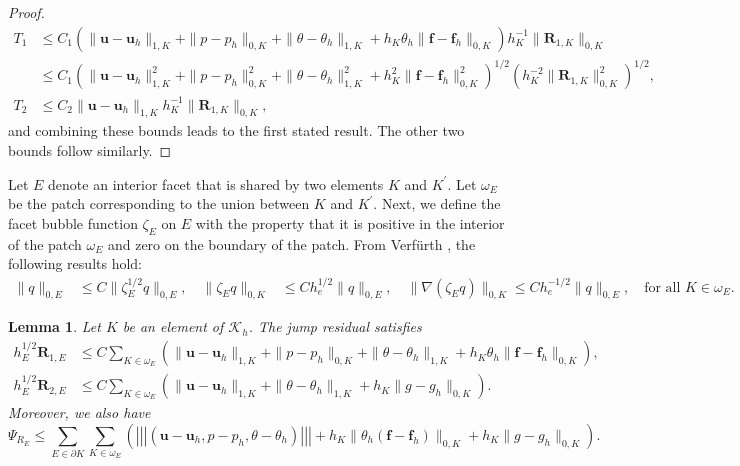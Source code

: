 \documentclass[10pt,a4paper]{article}
\newtheorem{lemma} {\bf Lemma}
\begin{document}
\begin{proof}
\begin{align*}
T_1 &\leq  C_1 \left( \| \boldsymbol{u} - \boldsymbol{u}_h \|_{1,K} + \|p-p_h\|_{0,K} + \|\theta -\theta_h\|_{1,K} + h_K \theta_h \|\boldsymbol{f}- \boldsymbol{f}_h \|_{0,K} \right) h_K^{-1} \| \boldsymbol{R}_{1,K}\|_{0,K} \\&
\leq  C_1 \left( \| \boldsymbol{u} - \boldsymbol{u}_h \|_{1,K}^2 + \|p-p_h\|_{0,K}^2 + \|\theta -\theta_h\|_{1,K}^2 + h_K^2 \|\boldsymbol{f}- \boldsymbol{f}_h \|_{0,K}^2 \right)^{1/2} \left(h_K^{-2} \| \boldsymbol{R}_{1,K}\|_{0,K}^2\right)^{1/2}, \\[4pt]
 T_2 & \leq C_2 \| \boldsymbol{u} - \boldsymbol{u}_h \|_{1,K} h_K^{-1} \|\boldsymbol{R}_{1,K} \|_{0,K},
\end{align*}
and combining these bounds leads to the first stated result. The other two bounds follow similarly. 
\end{proof}
Let $E$ denote an interior facet that is shared by two elements $K$ and $K^{\prime}$. Let $\omega_E$ be the patch corresponding to the
union between $K$ and $K^{\prime}$. Next, we define the facet bubble function $\zeta_E$ on $E$ with the property that it is positive
in the interior of the patch $\omega_E$ and zero on the boundary of the patch. From Verfürth \cite{MR3059294}, the following
results hold:
\begin{align}\label{edge_bubb}
\|q\|_{0,E} &\le C \|\zeta_E^{1/2} q\|_{0,E}, \quad
\|\zeta_E q\|_{0,K} &\le C h_e^{1/2} \|q\|_{0,E}, 
\quad \|\nabla(\zeta_E q)\|_{0,K} \le C h_e^{-1/2} \|q\|_{0,E},
\quad \text{for all } K \in \omega_E. 
\end{align}
\begin{lemma}\label{efficiency_2}
    Let $K$ be an element of $\mathcal{K}_h$. The jump residual satisfies 
\begin{align*}
   h_E^{1/2} \boldsymbol{R}_{1,E} &\leq C \sum_{K \in \omega_E} \left( \| \boldsymbol{u} - \boldsymbol{u}_h \|_{1,K} + \|p-p_h\|_{0,K} + \| \theta - \theta_h \|_{1,K} + h_K \theta_h \| \boldsymbol{f}- \boldsymbol{f}_h \|_{0,K} \right), \\
     h_E^{1/2} \boldsymbol{R}_{2,E} &\leq C \sum_{K \in \omega_E}\left( \| \boldsymbol{u} - \boldsymbol{u}_h \|_{1,K} + \|\theta -\theta_h\|_{1,K} + h_K \| g - g_h \|_{0,K} \right).
\end{align*}
    Moreover, we also have
    $$
\Psi_{R_E} \leq \sum_{E \in \partial K} \sum_{K \in \omega_E} \left(\left|\!\left|\!\left| (\boldsymbol{u}-\boldsymbol{u}_h , p -p_h, \theta - \theta_h)\right|\!\right|\!\right| + h_K \| \theta_h (\boldsymbol{f} - \boldsymbol{f}_h ) \|_{0,K} +h_K \|g-g_h\|_{0,K}  \right).
    $$
\end{lemma}
\end{document}
